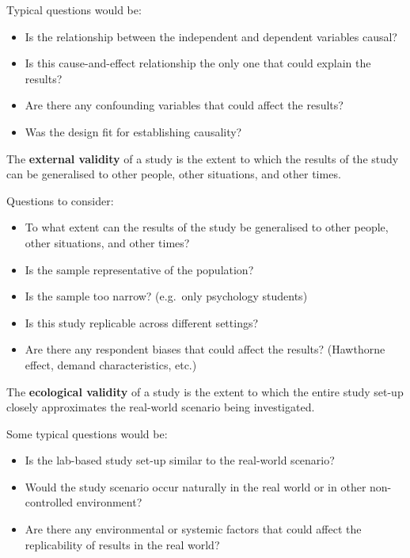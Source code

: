 \documentclass[
  11pt,
  a4paper,
  twoside,symmetric,openright]{book}
\providecommand{\tightlist}{%
  \setlength{\itemsep}{0pt}\setlength{\parskip}{0pt}}
\theoremstyle{break}
\theoremstyle{break}
\begin{document}
Typical questions would be:

\begin{itemize}
\tightlist
\item
  Is the relationship between the independent and dependent variables causal?
\item
  Is this cause-and-effect relationship the only one that could explain the results?
\item
  Are there any confounding variables that could affect the results?
\item
  Was the design fit for establishing causality?
\end{itemize}

\begin{definition}
\protect\hypertarget{def:defexternalvalidity}{}\label{def:defexternalvalidity}The \textbf{external validity} of a study is the extent to which the results of the study can be generalised to other people, other situations, and other times.
\end{definition}

Questions to consider:

\begin{itemize}
\tightlist
\item
  To what extent can the results of the study be generalised to other people, other situations, and other times?
\item
  Is the sample representative of the population?
\item
  Is the sample too narrow? (e.g.~only psychology students)
\item
  Is this study replicable across different settings?
\item
  Are there any respondent biases that could affect the results? (Hawthorne effect, demand characteristics, etc.)
\end{itemize}

\begin{definition}
\protect\hypertarget{def:defecologicalvalidity}{}\label{def:defecologicalvalidity}The \textbf{ecological validity} of a study is the extent to which the entire study set-up closely approximates the real-world scenario being investigated.
\end{definition}

Some typical questions would be:

\begin{itemize}
\tightlist
\item
  Is the lab-based study set-up similar to the real-world scenario?
\item
  Would the study scenario occur naturally in the real world or in other non-controlled environment?
\item
  Are there any environmental or systemic factors that could affect the replicability of results in the real world?
\end{itemize}
\end{document}
